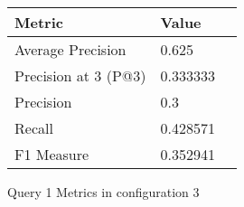 \begin{figure}[H]
\begin{center}
\begin{tabular}{lll}
\toprule
{}                      Metric &         Value \\
\midrule
     Average Precision &     0.625 \\
  Precision at 3 (P@3) &  0.333333 \\
             Precision &       0.3 \\
                Recall &  0.428571 \\
            F1 Measure &  0.352941 \\
\bottomrule
\end{tabular}
\end{center}
\caption{Query 1 Metrics in configuration 3}
\label{fig:query_1_metrics_config_3}
\end{figure}